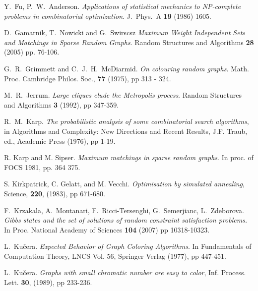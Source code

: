 \documentclass[a4paper,10pt]{article}
\newcommand{\Kucera}{Ku\v{c}era}
\begin{document}
\begin{thebibliography}{00}
Y.~Fu, P.~W.~Anderson.
{\em Applications of statistical mechanics to NP-complete problems in
 combinatorial optimization}. J.\ Phys.\ A {\bf 19} (1986) 1605.



D.~Gamarnik, T.~Nowicki and G.~Swirscsz
{\em Maximum Weight Independent Sets and Matchings in Sparse Random Graphs}.
Random Structures and Algorithms \textbf{28} (2005) pp. 76-106.



 G.~R.~Grimmett and C.~J.~H.~McDiarmid. 
{\em On colouring random graphs}.
Math. Proc. Cambridge Philos. Soc., \textbf{77} (1975), pp 313 - 324.



 M.~R.~Jerrum. 
{\em Large cliques elude the Metropolis process}.
Random Structures and Algorithms \textbf{3} (1992), pp 347-359.





 R.~M.~Karp. 
{\em The probabilistic analysis of some combinatorial search algorithms}, 
in Algorithms and Complexity: New Directions and Recent Results, J.F. Traub, ed., 
Academic Press (1976), pp 1-19.




 R. Karp and M. Sipser. 
{\em Maximum matchings in sparse random graphs}. 
In proc. of FOCS 1981, pp. 364 375.



S. Kirkpatrick, C. Gelatt, and M. Vecchi.
{\em Optimisation by simulated annealing}, Science, \textbf{220}, (1983), pp 671-680.



F.~Krzakala, A.~Montanari, F.~Ricci-Tersenghi, G.~Semerjianc, 
L.~Zdeborova. {\em Gibbs states and the set of solutions of random constraint 
satisfaction problems.} In Proc. National Academy of Sciences \textbf{104} (2007)
pp 10318-10323.




L.~\Kucera.  
{\em Expected Behavior of Graph Coloring Algorithms}.
In Fundamentals of Computation Theory, LNCS Vol. 56, Springer Verlag (1977), pp 447-451.



L.~\Kucera. {\em Graphs with small chromatic number are easy to color},
Inf. Process. Lett. \textbf{30}, (1989), pp 233-236.




\end{thebibliography}
\end{document}
